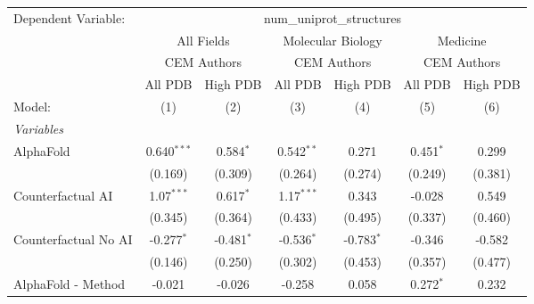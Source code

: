 \begingroup
\centering
\begin{tabular}{lcccccc}
   \tabularnewline \midrule \midrule
   Dependent Variable: & \multicolumn{6}{c}{num\_uniprot\_structures}\\
 & \multicolumn{2}{c}{All Fields} & \multicolumn{2}{c}{Molecular Biology} & \multicolumn{2}{c}{Medicine} \\
\cmidrule(lr){2-3} \cmidrule(lr){4-5} \cmidrule(lr){6-7}
 & \multicolumn{2}{c}{CEM Authors} & \multicolumn{2}{c}{CEM Authors} & \multicolumn{2}{c}{CEM Authors} \\
\cmidrule(lr){2-3} \cmidrule(lr){4-5} \cmidrule(lr){6-7}
 & \multicolumn{1}{c}{All PDB} & \multicolumn{1}{c}{High PDB} & \multicolumn{1}{c}{All PDB} & \multicolumn{1}{c}{High PDB} & \multicolumn{1}{c}{All PDB} & \multicolumn{1}{c}{High PDB} \\
\cmidrule(lr){2-2} \cmidrule(lr){3-3} \cmidrule(lr){4-4} \cmidrule(lr){5-5} \cmidrule(lr){6-6} \cmidrule(lr){7-7}
   Model:                                                     & (1)           & (2)          & (3)          & (4)          & (5)            & (6)\\  
   \midrule
   \emph{Variables}\\
   AlphaFold                                                  & 0.640$^{***}$ & 0.584$^{*}$  & 0.542$^{**}$ & 0.271        & 0.451$^{*}$    & 0.299\\   
                                                              & (0.169)       & (0.309)      & (0.264)      & (0.274)      & (0.249)        & (0.381)\\   
   Counterfactual AI                                          & 1.07$^{***}$  & 0.617$^{*}$  & 1.17$^{***}$ & 0.343        & -0.028         & 0.549\\   
                                                              & (0.345)       & (0.364)      & (0.433)      & (0.495)      & (0.337)        & (0.460)\\   
   Counterfactual No AI                                       & -0.277$^{*}$  & -0.481$^{*}$ & -0.536$^{*}$ & -0.783$^{*}$ & -0.346         & -0.582\\   
                                                              & (0.146)       & (0.250)      & (0.302)      & (0.453)      & (0.357)        & (0.477)\\   
   AlphaFold - Method                                         & -0.021        & -0.026       & -0.258       & 0.058        & 0.272$^{*}$    & 0.232\\   

\end{tabular}
